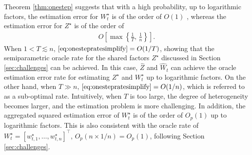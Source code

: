 \documentclass[12pt]{article}
\begin{document}
Theorem \ref{thm:onestep} suggests that with a high probability, up to logarithmic factors, the estimation error for $W_t^{\star}$ is of the order of $O(1)$ , whereas the estimation error for $Z^{\star}$ is of the order of
\begin{align} \label{eq:onestepratesimplify}
  O\left[  \max \left\{\frac{1}{T},\, \frac{1}{n}\right\} \right]. 
\end{align}
When $1<T\lesssim n$, $\eqref{eq:onestepratesimplify} = O(1/T)$, showing that the semiparametric oracle rate for the shared factors $Z^{\star}$ discussed in Section \ref{sec:challenges} can be achieved. 
In this case,  $\hat{Z}$ and $\hat{W}_t$ can achieve the oracle estimation error rate for estimating $Z^{\star}$ and $W_t^{\star}$ up to logarithmic factors. 
On the other hand, when $T\gg n$, $\eqref{eq:onestepratesimplify} = O(1/n)$, which is referred to as a sub-optimal rate. 
Intuitively, when $T$ is too large, the degree of heterogeneity becomes larger, and the estimation problem is more challenging. 
In addition, the aggregated squared estimation error of $W_t^{\star}$ is of the order of $O_p(1)$ up to logarithmic factors. 
This is also consistent with the oracle rate of $W_t^{\star}=[w_{t,1}^{\star},\ldots, w_{t,n}^{\star}]^{\top}$,  $O_p(n\times 1/n)= O_p(1)$,  following Section \ref{sec:challenges}. 
\end{document}
